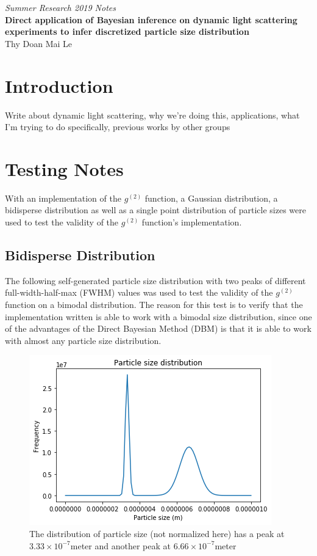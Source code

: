\documentclass[11pt]{article}
\begin{document}
\centering
\textit{Summer Research 2019 Notes}\\
\textbf{Direct application of Bayesian inference on dynamic light scattering experiments to infer discretized particle size distribution}\\
Thy Doan Mai Le

\justifying
\section{Introduction}
Write about dynamic light scattering, why we're doing this, applications, what I'm trying to do specifically, previous works by other groups

\section{Testing Notes}
With an implementation of the $g^{(2)}$ function, a Gaussian distribution, a bidisperse distribution as well as a single point distribution of particle sizes were used to test the validity of the $g^{(2)}$ function's implementation. 
\subsection{Bidisperse Distribution}
The following self-generated particle size distribution with two peaks of different full-width-half-max (FWHM) values was used to test the validity of the $g^{(2)}$ function on a bimodal distribution. The reason for this test is to verify that the implementation written is able to work with a bimodal size distribution, since one of the advantages of the Direct Bayesian Method (DBM) is that it is able to work with almost any particle size distribution. 

\begin{figure}[h]
\centering
\includegraphics[width=0.5\linewidth]{bidisperse_psd.png}
\caption{The distribution of particle size (not normalized here) has a peak at $3.33\times10^{-7}$\si{meter} and another peak at $6.66\times10^{-7}$\si{meter}}
\label{fig:bidisperse_psd}
\end{figure}
\end{document}
